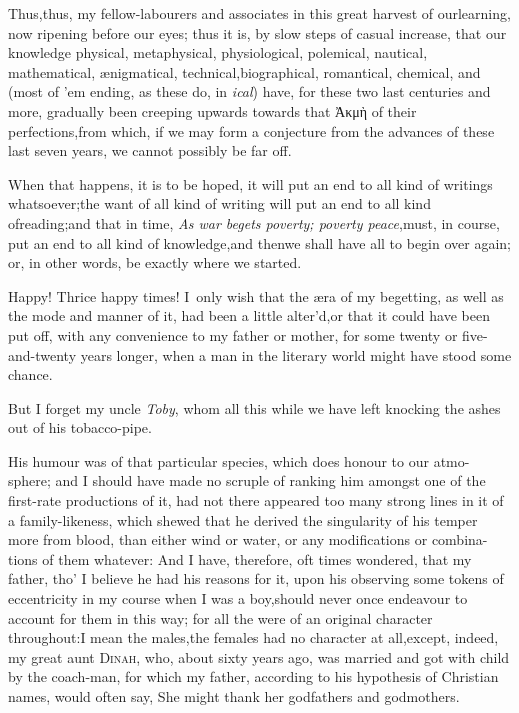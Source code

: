 \documentclass{article}
\begin{document}
Thus,\tsk  thus, my fellow-labourers and associates in this great harvest of
our\pb learning, now ripening before our eyes; thus it is, by slow steps of casual
increase, that our knowledge physical, metaphysical, physiological, polemical,
nautical, mathematical, ænigmatical, technical,\break biographical, romantical,
chemical, and 
\break
(most of ’em ending, as these do, in \textit{ical}) 
have, for these two last centuries and more, gradually been creeping upwards towards that Ἀκμὴ of their
perfections,\break from which, if we may form a conjecture from the advances of these last
seven years, we cannot possibly be far off.

When that happens, it is to be hoped, it will put an end to all
kind of writings whatsoever;\tsk  the want of all kind of writing
will put an end to all kind of\break reading;\tsk  and that in time,
\textit{As war be\-gets poverty; poverty peace},\tsh  must, in\pb
course, put an end to all kind of know\-ledge,\tsk  and
then\tsh  we shall have all to begin over again; or, in
other words, be exactly where we started.

\tsh  Happy! Thrice happy times! I~only wish that the æra of my begetting, as well
as the mode and manner of it, had been a little alter’d,\tsk  or that it could have
been put off, with any convenience to my father or mother, for some twenty or
five-and-twenty years longer, when a man in the literary world might have\break
stood some chance.\tsh 

But I forget my uncle \textit{Toby}, whom all this while we have
left knocking the ashes out of his tobacco-pipe.

His humour was of that particular\break
species, which does honour to our atmo-\pb
sphere; and I should have made no scruple of ranking him
amongst one of the first-rate productions of it, had not there
appeared too many strong lines in it of a family-likeness, which
shewed that he derived the singularity of his temper\break
more from blood, than either wind or\break 
water, or any modifications or combina-\break
tions of them whatever: And I have, therefore, oft times
wondered, that my father, tho’ I believe he had his reasons
for it, upon his observing some tokens of eccentricity in my
course when I was a boy,\tsk  should never once endeavour to
account for them in this way; for all the\break
{} were of an original character
throughout:\tsh  I mean the males,\tsk  the females had no
character at all,\tsk  except, indeed, my great aunt
\textsc{Dinah}, who, about sixty years ago, was married and got with child by the
coach-\pb man,
for which my father, according to his hypothesis of Christian
names, would often say, She might thank her godfathers and
godmothers.
\end{document}
